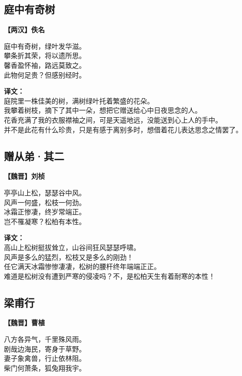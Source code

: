 
\subsection*{庭中有奇树}
\textbf{【两汉】佚名}

庭中有奇树，绿叶发华滋。\\
攀条折其荣，将以遗所思。\\
馨香盈怀袖，路远莫致之。\\
此物何足贵？但感别经时。

\bigskip
\noindent\textbf{译文：}\\
庭院里一株佳美的树，满树绿叶托着繁盛的花朵。\\
我攀着树枝，摘下了其中一朵，想把它赠送给心中日夜思念的人。\\
花香充满了我的衣服襟袖之间，可是天遥地远，没能送到心上人的手中。\\
并不是此花有什么珍贵，只是有感于离别多时，想借着花儿表达思念之情罢了。


\subsection*{赠从弟·其二}
\textbf{【魏晋】刘桢}

亭亭山上松，瑟瑟谷中风。\\
风声一何盛，松枝一何劲。\\
冰霜正惨凄，终岁常端正。\\
岂不罹凝寒？松柏有本性。

\bigskip
\noindent\textbf{译文：}\\
高山上松树挺拔耸立，山谷间狂风瑟瑟呼啸。\\
风声是多么的猛烈，松枝又是多么的刚劲！\\
任它满天冰霜惨惨凄凄，松树的腰杆终年端端正正。\\
难道是松树没有遭到严寒的侵凌吗？不，是松柏天生有着耐寒的本性！


\subsection*{梁甫行}
\textbf{【魏晋】曹植}

八方各异气，千里殊风雨。\\
剧哉边海民，寄身于草野。\\
妻子象禽兽，行止依林阻。\\
柴门何萧条，狐兔翔我宇。

